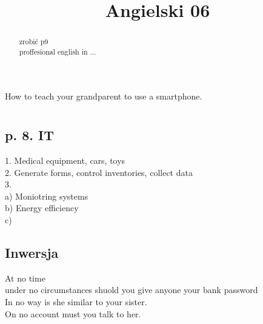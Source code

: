 \documentclass[a4paper,12pt]{article}
\title{Angielski 06}
\author{}
\begin{document}
\maketitle

\begin{abstract}
zrobić p9\\
proffesional english in ...\\
\end{abstract}
How to teach your grandparent to use a smartphone.

\section{}
\subsection{p. 8. IT}
1. Medical equipment, cars, toys\\
2. Generate forms, control inventories, collect data\\
3. \\
    a) Moniotring systems\\
    b) Energy efficiency \\
    c) \\
\subsection{Inwersja}
At no time \\
under no circumstances shuold you give anyone your bank password \\
In no way is she similar to your sister.\\
On no account must you talk to her.\\
\end{document}

